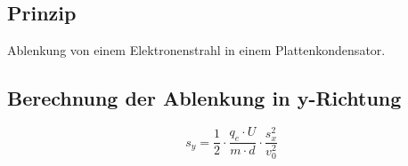 




%
%	





\subsection{Prinzip}

Ablenkung von einem Elektronenstrahl in einem Plattenkondensator.


\subsection{Berechnung der Ablenkung in y-Richtung}

\begin{equation}
	s_y=\frac{1}{2} \cdot \frac{q_e \cdot U}{m \cdot d}
	\cdot \frac{s^2_x}{v^2_0}
\end{equation}